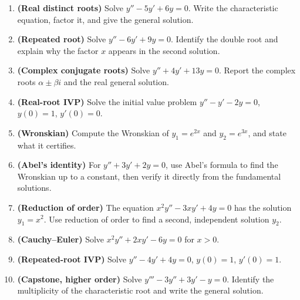 \begin{enumerate}[leftmargin=2em]
    \item \textbf{(Real distinct roots)} Solve $y'' - 5y' + 6y = 0$. Write the
          characteristic equation, factor it, and give the general solution.

    \item \textbf{(Repeated root)} Solve $y'' - 6y' + 9y = 0$. Identify the
          double root and explain why the factor $x$ appears in the second
          solution.

    \item \textbf{(Complex conjugate roots)} Solve $y'' + 4y' + 13y = 0$.
          Report the complex roots $\alpha\pm\beta i$ and the real general
          solution.

    \item \textbf{(Real-root IVP)} Solve the initial value problem
          $y'' - y' - 2y = 0$, $y(0) = 1$, $y'(0) = 0$.

    \item \textbf{(Wronskian)} Compute the Wronskian of $y_1 = e^{2x}$ and
          $y_2 = e^{3x}$, and state what it certifies.

    \item \textbf{(Abel's identity)} For $y'' + 3y' + 2y = 0$, use Abel's formula
          to find the Wronskian up to a constant, then verify it directly from the
          fundamental solutions.

    \item \textbf{(Reduction of order)} The equation $x^2 y'' - 3x y' + 4y = 0$
          has the solution $y_1 = x^2$. Use reduction of order to find a second,
          independent solution $y_2$.

    \item \textbf{(Cauchy--Euler)} Solve $x^2 y'' + 2x y' - 6y = 0$ for $x>0$.

    \item \textbf{(Repeated-root IVP)} Solve $y'' - 4y' + 4y = 0$,
          $y(0) = 1$, $y'(0) = 1$.

    \item \textbf{(Capstone, higher order)} Solve $y''' - 3y'' + 3y' - y = 0$.
          Identify the multiplicity of the characteristic root and write the
          general solution.
\end{enumerate}

\clearpage
{}
{}
